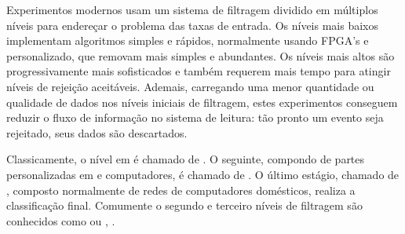 Experimentos modernos usam um sistema de filtragem dividido em múltiplos
níveis para endereçar o problema das taxas de entrada. Os níveis mais baixos
implementam algoritmos simples e rápidos, normalmente usando FPGA's e
 personalizado, que removam  mais simples e
abundantes. Os níveis mais altos são progressivamente mais sofisticados e
também requerem mais tempo para atingir níveis de rejeição
aceitáveis. Ademais, carregando uma menor quantidade ou qualidade de dados nos
níveis iniciais de filtragem, estes experimentos conseguem reduzir o fluxo de
informação no sistema de leitura: tão pronto um evento seja rejeitado, seus
dados são descartados.

Classicamente, o nível em  é chamado de . O
seguinte, compondo de partes personalizadas em  e computadores,
é chamado de . O último estágio, chamado de
, composto normalmente de redes de computadores
domésticos, realiza a classificação final. Comumente o segundo e terceiro
níveis de filtragem são conhecidos como  ou
, .

